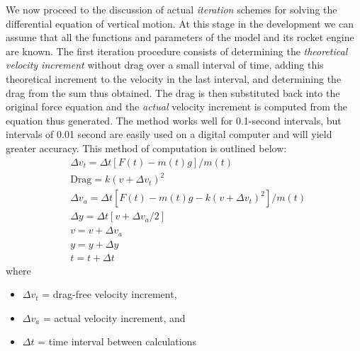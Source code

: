 We now proceed to the discussion of actual \emph{iteration} schemes for solving the differential equation
of vertical motion. At this stage in the development we can assume that all the functions and parameters of
the model and its rocket engine are known. The first iteration procedure consists of determining the
\emph{theoretical velocity increment} without drag over a small interval of time, adding this theoretical
increment to the velocity in the last interval, and determining the drag from the sum thus obtained. The
drag is then substituted back into the original force equation and the \emph{actual} velocity increment is
computed from the equation thus generated. The method works well for 0.1-second intervals, but intervals of
0.01 second are easily used on a digital computer and will yield greater accuracy. This method of
computation is outlined below:
\begin{align}
&\Delta v_t = \Delta t[F(t) - m(t)g]/m(t) \label{ch4:eq:76}\\
&\text{Drag} = k(v + \Delta v_t)^{2} \label{ch4:eq:77}\\
&\Delta v_a = \Delta t[F(t) - m(t)g - k(v + \Delta v_t)^{2}]/m(t) \label{ch4:eq:78}\\
&\Delta y = \Delta t[v + \Delta v_a/2] \label{ch4:eq:79}\\
&v = v + \Delta v_a \label{ch4:eq:80}\\
&y = y + \Delta y \label{ch4:eq:81}\\
&t = t + \Delta t \label{ch4:eq:82}
\end{align}
where
\begin{itemize}[nosep,leftmargin=*,label={}]
  \item $\Delta v_t$ = drag-free velocity increment,
  \item $\Delta v_a$ = actual velocity increment, and
  \item $\Delta t$ = time interval between calculations
\end{itemize}

